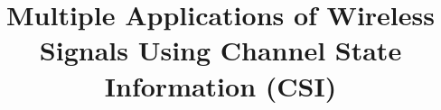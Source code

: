 \documentclass[conference]{IEEEtran}
\begin{document}
%
\title{Multiple Applications of Wireless Signals Using Channel State Information (CSI)}


\end{document}
